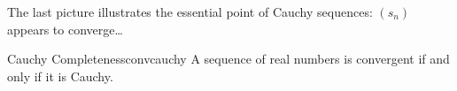 
The last picture illustrates the essential point of Cauchy sequences: $(s_n)$ appears to converge\ldots





\begin{thm}{Cauchy Completeness}{convcauchy}
	A sequence of real numbers is convergent if and only if it is Cauchy.
\end{thm}

